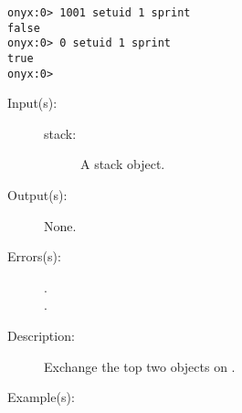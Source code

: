 \begin{description}
\begin{description}
\begin{verbatim}
onyx:0> 1001 setuid 1 sprint
false
onyx:0> 0 setuid 1 sprint
true
onyx:0>
		\end{verbatim}
	\end{description}
\label{systemdict:sexch}
\item[{\onyxop{stack}{sexch}{--}}: ]
	\begin{description}\item[]
	\item[Input(s): ]
		\begin{description}\item[]
		\item[stack: ]
			A stack object.
		\end{description}
	\item[Output(s): ] None.
	\item[Errors(s): ]
		\begin{description}\item[]
		\item[.]
		\item[.]
		\end{description}
	\item[Description: ]
		Exchange the top two objects on .
	\item[Example(s): ]\begin{verbatim}


\end{verbatim}
\end{description}
\end{description}

